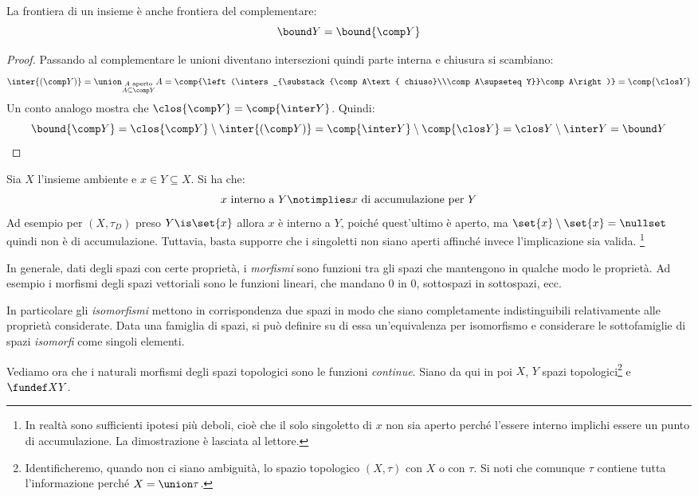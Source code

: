 \begin{prop}
	La frontiera di un insieme è anche frontiera del complementare:
	\[\bound Y=\bound{\comp Y}\]
\end{prop}

\begin{proof}
	Passando al complementare le unioni diventano intersezioni quindi parte interna e chiusura si scambiano:
	\[\inter{(\comp Y)}=
	\union_{\substack{A\text{ aperto}\\A\subseteq\comp Y}}A=
	\comp{\left(\inters_{\substack{\comp A\text{ chiuso}\\\comp A\supseteq Y}}\comp A\right)}=
	\comp{\clos Y}\]
	Un conto analogo mostra che $\clos{\comp Y}=\comp{\inter Y}$.
	Quindi:
	\[\bound{\comp Y}=\clos{\comp Y}\setminus\inter{(\comp Y)}=\comp{\inter Y}\setminus\comp{\clos Y}=\clos Y\setminus\inter Y=\bound Y \qedhere\]
\end{proof}

\begin{oss}
	\label{th:osspulciosa}
	Sia $X$ l'insieme ambiente e $x\in Y\subseteq X$.
	Si ha che:
	\[\text{$x$ interno a $Y$} \notimplies \text{$x$ di accumulazione per $Y$}\]
	Ad esempio per $(X, \tau_D)$ preso $Y\is\set{x}$ allora $x$ è interno a $Y$, poiché quest'ultimo è aperto, ma $\set{x}\setminus\set{x} = \nullset$ quindi non è di accumulazione.
	Tuttavia, basta supporre che i singoletti non siano aperti affinché invece l'implicazione sia valida.
	\footnote{In realtà sono sufficienti ipotesi più deboli, cioè che il solo singoletto di $x$ non sia aperto perché l'essere interno implichi essere un punto di accumulazione. La dimostrazione è lasciata al lettore.}
\end{oss}


In generale, dati degli spazi con certe proprietà, i \emph{morfismi} sono funzioni tra gli spazi che mantengono in qualche modo le proprietà. Ad esempio i morfismi degli spazi vettoriali sono le funzioni lineari, che mandano 0 in 0, sottospazi in sottospazi, ecc.

In particolare gli \emph{isomorfismi} mettono in corrispondenza due spazi in modo che siano completamente indistinguibili relativamente alle proprietà considerate. Data una famiglia di spazi, si può definire su di essa un'equivalenza per isomorfismo e considerare le sottofamiglie di spazi \emph{isomorfi} come singoli elementi.

Vediamo ora che i naturali morfismi degli spazi topologici sono le funzioni \emph{continue}. Siano da qui in poi $X$, $Y$ spazi topologici\footnote{Identificheremo, quando non ci siano ambiguità, lo spazio topologico $(X,\tau)$ con $X$ o con $\tau$. Si noti che comunque $\tau$ contiene tutta l'informazione perché $X=\union\tau$.} e $\fundef XY$.

